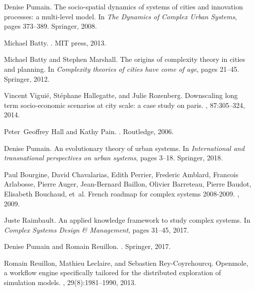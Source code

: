 \begin{thebibliography}{10}

Denise Pumain.
\newblock The socio-spatial dynamics of systems of cities and innovation
  processes: a multi-level model.
\newblock In {\em The Dynamics of Complex Urban Systems}, pages 373--389.
  Springer, 2008.

Michael Batty.
.
\newblock MIT press, 2013.

Michael Batty and Stephen Marshall.
\newblock The origins of complexity theory in cities and planning.
\newblock In {\em Complexity theories of cities have come of age}, pages
  21--45. Springer, 2012.

Vincent Vigui{\'e}, St{\'e}phane Hallegatte, and Julie Rozenberg.
\newblock Downscaling long term socio-economic scenarios at city scale: a case
  study on paris.
, 87:305--324, 2014.

Peter~Geoffrey Hall and Kathy Pain.
.
\newblock Routledge, 2006.

Denise Pumain.
\newblock An evolutionary theory of urban systems.
\newblock In {\em International and transnational perspectives on urban
  systems}, pages 3--18. Springer, 2018.

Paul Bourgine, David Chavalarias, Edith Perrier, Frederic Amblard, Francois
  Arlabosse, Pierre Auger, Jean-Bernard Baillon, Olivier Barreteau, Pierre
  Baudot, Elisabeth Bouchaud, et~al.
\newblock French roadmap for complex systems 2008-2009.
, 2009.

Juste Raimbault.
\newblock An applied knowledge framework to study complex systems.
\newblock In {\em Complex Systems Design \& Management}, pages 31--45, 2017.

Denise Pumain and Romain Reuillon.
.
\newblock Springer, 2017.

Romain Reuillon, Mathieu Leclaire, and Sebastien Rey-Coyrehourcq.
\newblock Openmole, a workflow engine specifically tailored for the distributed
  exploration of simulation models.
, 29(8):1981--1990, 2013.


\end{thebibliography}
